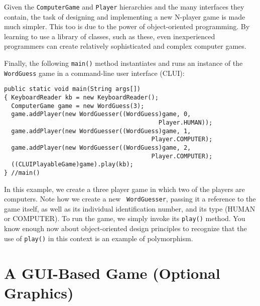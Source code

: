 Given the {\tt ComputerGame} and {\tt Player} hierarchies and
the many interfaces they contain, the task of designing and
implementing a new N-player game is made much simpler. This too is due
to the power of object-oriented programming. By learning to use a
library of classes, such as these, even inexperienced programmers can
create relatively sophisticated and complex computer games.


Finally, the following {\tt main()} method instantiates and runs an instance
of the {\tt WordGuess} game in a command-line user interface (CLUI):

\begin{jjjlisting}
\begin{lstlisting}
public static void main(String args[]) 
{ KeyboardReader kb = new KeyboardReader();
  ComputerGame game = new WordGuess(3);
  game.addPlayer(new WordGuesser((WordGuess)game, 0, 
                                           Player.HUMAN));
  game.addPlayer(new WordGuesser((WordGuess)game, 1, 
                                         Player.COMPUTER);
  game.addPlayer(new WordGuesser((WordGuess)game, 2, 
                                         Player.COMPUTER);
  ((CLUIPlayableGame)game).play(kb);
} //main()
\end{lstlisting}
\end{jjjlisting}

\noindent In this example, we create a three player game in which two
of the players are computers.  Note how we create a new {\tt
WordGuesser}, passing it a reference to the game itself, as well as
its individual identification number, and its type (HUMAN or
COMPUTER).  To run the game, we simply invoke its {\tt play()} method.
You know enough now about object-oriented design principles to
recognize that the use of {\tt play()} in this context is an example
of polymorphism.


\section{A GUI-Based Game (Optional Graphics)}


